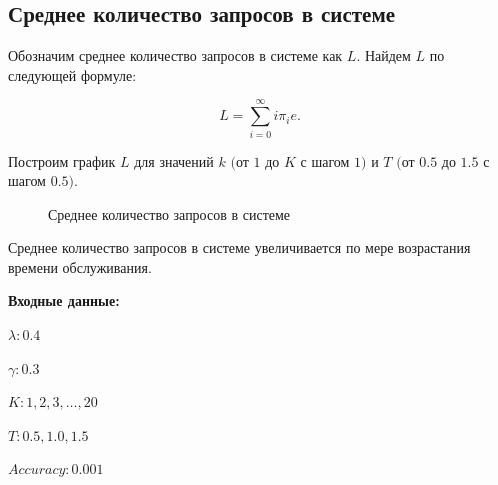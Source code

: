 \documentclass[12pt, a4paper]{article}
\begin{document}
\subsection{Среднее количество запросов в системе}


Обозначим среднее количество запросов в системе как $L$. Найдем $L$ по следующей формуле:

$$L = \sum\limits_{i = 0}^{\infty} i \pi_i e.$$

Построим график $L$ для значений $k$ $($от $1$ до $K$ с шагом $1)$ и  $T$ $($от $0.5$ до $1.5$  с шагом $0.5)$.

\begin{figure}[h]
	\caption{Среднее количество запросов в системе}
	\label{ris2}
\end{figure}


Среднее количество запросов в системе увеличивается по мере возрастания времени обслуживания. \pagebreak

\textbf{Входные данные:}

$\lambda: 0.4$

$\gamma: 0.3$

$K: 1, 2, 3, \ldots, 20$

$T: 0.5, 1.0, 1.5$

$Accuracy: 0.001$
\end{document}
